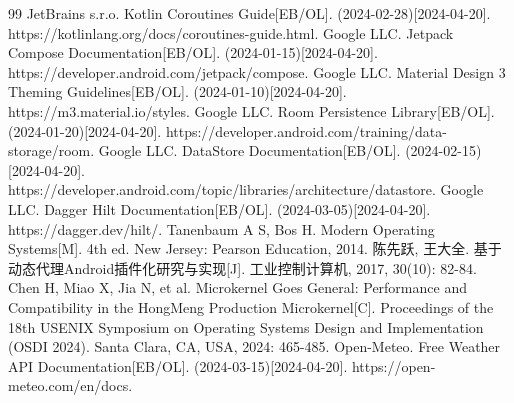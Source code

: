 \documentclass[12pt,AutoFakeBold]{xuptThesis}
\begin{document}
\begin{thebibliography}{99}
 JetBrains s.r.o. Kotlin Coroutines Guide[EB/OL]. (2024-02-28)[2024-04-20]. https://kotlinlang.org/docs/coroutines-guide.html.
 Google LLC. Jetpack Compose Documentation[EB/OL]. (2024-01-15)[2024-04-20]. https://developer.android.com/jetpack/compose.
 Google LLC. Material Design 3 Theming Guidelines[EB/OL]. (2024-01-10)[2024-04-20]. https://m3.material.io/styles.
 Google LLC. Room Persistence Library[EB/OL]. (2024-01-20)[2024-04-20]. https://developer.android.com/training/data-storage/room.
 Google LLC. DataStore Documentation[EB/OL]. (2024-02-15)[2024-04-20]. https://developer.android.com/topic/libraries/architecture/datastore.
 Google LLC. Dagger Hilt Documentation[EB/OL]. (2024-03-05)[2024-04-20]. https://dagger.dev/hilt/.
 Tanenbaum A S, Bos H. Modern Operating Systems[M]. 4th ed. New Jersey: Pearson Education, 2014.
 陈先跃, 王大全. 基于动态代理Android插件化研究与实现[J]. 工业控制计算机, 2017, 30(10): 82-84.
 Chen H, Miao X, Jia N, et al. Microkernel Goes General: Performance and Compatibility in the HongMeng Production Microkernel[C]. Proceedings of the 18th USENIX Symposium on Operating Systems Design and Implementation (OSDI 2024). Santa Clara, CA, USA, 2024: 465-485.
 Open-Meteo. Free Weather API Documentation[EB/OL]. (2024-03-15)[2024-04-20]. https://open-meteo.com/en/docs.
\end{thebibliography}




\end{document}
